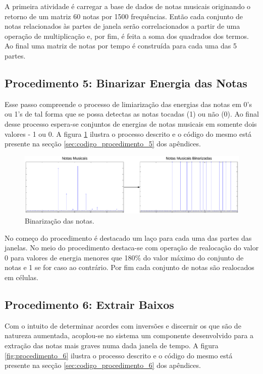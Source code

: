A primeira atividade é carregar a base de dados de notas musicais originando o retorno de um matriz 60 notas por 1500 frequências. Então cada conjunto de notas relacionados às partes de janela serão correlacionados a partir de uma operação de multiplicação e, por fim, é feita a soma dos quadrados dos termos. Ao final uma matriz de notas por tempo é construída para cada uma das 5 partes.

\subsection{Procedimento 5: Binarizar Energia das Notas}
\label{subsec:procedimento_5}

Esse passo compreende o processo de limiarização das energias das notas em 0's ou 1's de tal forma que se possa detectas as notas tocadas (1) ou não (0). Ao final desse processo espera-se conjuntos de energias de notas musicais em somente dois valores - 1 ou 0. A figura \ref{fig:procedimento_5} ilustra o processo descrito e o código do mesmo está presente na secção \ref{sec:codigo_procedimento_5} dos apêndices.

\begin{figure}[h] 
  \centering
    \includegraphics[keepaspectratio=true, scale=0.55]{figuras/procedimento_5}
    \caption{Binarização das notas.}
    \label{fig:procedimento_5}
\end{figure}

No começo do procedimento é destacado um laço para cada uma das partes das janelas. No meio do procedimento destaca-se com operação de realocação do valor 0 para valores de energia menores que 180\% do valor máximo do conjunto de notas e 1 se for caso ao contrário. Por fim cada conjunto de notas são realocados em células.

\subsection{Procedimento 6: Extrair Baixos}
\label{subsec:procedimento_6}

Com o intuito de determinar acordes com inversões e discernir os que são de natureza aumentada, acoplou-se no sistema um componente desenvolvido para a extração das notas mais graves numa dada janela de tempo. A figura \ref{fig:procedimento_6} ilustra o processo descrito e o código do mesmo está presente na secção \ref{sec:codigo_procedimento_6} dos apêndices.

